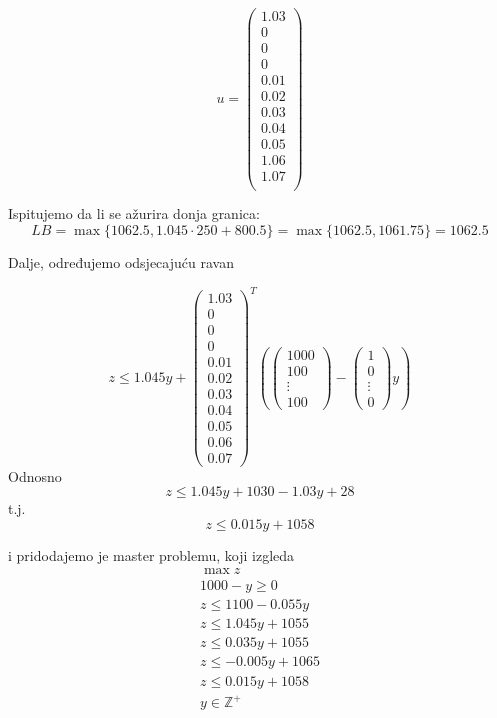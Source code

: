 \documentclass[a4paper, utf8, 11pt, colorlinks]{book}
\begin{document}
 
 $$u=\left(\begin{array}{c}
 	1.03\\
 		0\\
 		0\\
 		0\\
 0.01\\
 0.02\\
 0.03\\
 0.04\\
 0.05\\
 	1.06\\
 	1.07 \\
 \end{array}\right)$$
 
 Ispitujemo da li se ažurira donja granica:
 $$LB = \max\{1062.5, 1.045\cdot 250+ 800.5\} = \max\{1062.5,1061.75\}=1062.5$$
 
 Dalje, određujemo odsjecajuću ravan
 
 
 $$z\leqslant 1.045y+\left(\begin{array}{c}
 	1.03 \\
 	0 \\
 	0\\
 	0\\
 	0.01\\
 	0.02\\
 	0.03\\
 	0.04\\
 	0.05\\
 	0.06\\
 	0.07
 \end{array}\right)^T
 \left(\left(\begin{array}{c}
 	1000 \\
 	100 \\
 	\vdots \\
 	100
 \end{array}\right)-\left(\begin{array}{c}
 	1 \\
 	0 \\
 	\vdots \\
 	0
 \end{array}\right)y\right)$$
 Odnosno 
 $$z\leqslant 1.045y+1030-1.03y+28$$
 t.j.
 $$z\leqslant 0.015y+1058$$
 
 i pridodajemo je master problemu, koji izgleda
  $$
 \begin{aligned}
 	\max z\\
 	1000-y\geqslant 0\\
 	z\leqslant 1100-0.055y\\ 
 	z\leqslant 1.045y+1055\\
 	z\leqslant 0.035y+1055\\
 	z\leqslant -0.005y+1065\\
 	z\leqslant 0.015y+1058\\
 	y\in\mathbb{Z}^+\\	
 \end{aligned}
 $$
 
\end{document}

